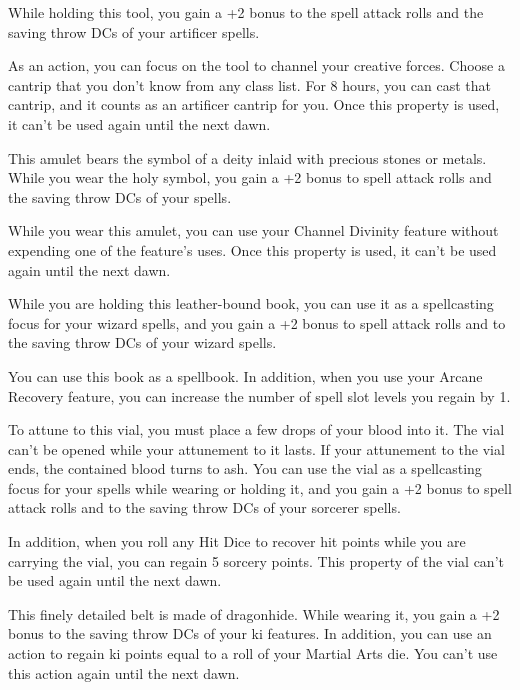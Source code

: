 \documentclass[10pt,a4paper,twoside,bg=print,twocolumn,openany,nodeprecatedcode]{dndbook}
\begin{document}
While holding this tool, you gain a +2 bonus to the spell attack rolls and the saving throw DCs of your artificer spells.

As an action, you can focus on the tool to channel your creative forces. Choose a cantrip that you don't know from any class list. For 8 hours, you can cast that cantrip, and it counts as an artificer cantrip for you. Once this property is used, it can't be used again until the next dawn.

This amulet bears the symbol of a deity inlaid with precious stones or metals. While you wear the holy symbol, you gain a +2 bonus to spell attack rolls and the saving throw DCs of your spells.

While you wear this amulet, you can use your Channel Divinity feature without expending one of the feature's uses. Once this property is used, it can't be used again until the next dawn.

While you are holding this leather-bound book, you can use it as a spellcasting focus for your wizard spells, and you gain a +2 bonus to spell attack rolls and to the saving throw DCs of your wizard spells.

You can use this book as a spellbook. In addition, when you use your Arcane Recovery feature, you can increase the number of spell slot levels you regain by 1.

To attune to this vial, you must place a few drops of your blood into it. The vial can't be opened while your attunement to it lasts. If your attunement to the vial ends, the contained blood turns to ash. You can use the vial as a spellcasting focus for your spells while wearing or holding it, and you gain a +2 bonus to spell attack rolls and to the saving throw DCs of your sorcerer spells.

In addition, when you roll any Hit Dice to recover hit points while you are carrying the vial, you can regain 5 sorcery points. This property of the vial can't be used again until the next dawn.

This finely detailed belt is made of dragonhide. While wearing it, you gain a +2 bonus to the saving throw DCs of your ki features. In addition, you can use an action to regain ki points equal to a roll of your Martial Arts die. You can't use this action again until the next dawn.
\end{document}
